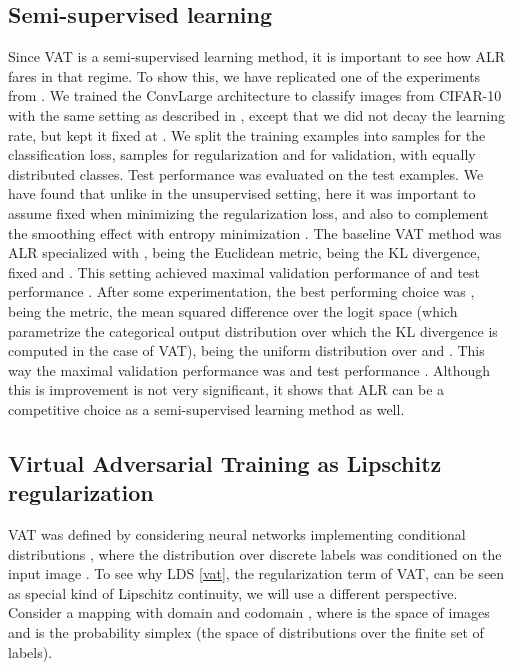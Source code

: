 \documentclass{article}
\begin{document}
\subsection{Semi-supervised learning} \label{semisup}
Since VAT is a semi-supervised learning method, it is important to see how ALR fares in that regime. To show this, we have replicated one of the experiments from \citet{Miyatoetal2017}. We trained the ConvLarge architecture to classify images from CIFAR-10 with the same setting as described in  \citet{Miyatoetal2017}, except that we did not decay the learning rate, but kept it fixed at . We split the  training examples into  samples for the classification loss,  samples for regularization and  for validation, with equally distributed classes. Test performance was evaluated on the  test examples. We have found that unlike in the unsupervised setting, here it was important to assume  fixed when minimizing the regularization loss, and also to complement the smoothing effect with entropy minimization \citep{Grandvaletetal2005}. The baseline VAT method was ALR specialized with ,  being the Euclidean metric,  being the KL divergence, fixed  and . This setting achieved maximal validation performance of  and test performance . After some experimentation, the best performing choice was ,  being the  metric,  the mean squared difference over the logit space (which parametrize the categorical output distribution over which the KL divergence is computed in the case of VAT),  being the uniform distribution over  and . This way the maximal validation performance was  and test performance . Although this  is improvement is not very significant, it shows that ALR can be a competitive choice as a semi-supervised learning method as well.

\subsection{Virtual Adversarial Training as Lipschitz regularization} \label{vat_as_lr}
VAT was defined by considering neural networks implementing conditional distributions , where the distribution over discrete labels  was conditioned on the input image  \cite{Miyatoetal2017}. To see why LDS \eqref{vat}, the regularization term of VAT, can be seen as special kind of Lipschitz continuity, we will use a different perspective. Consider a mapping  with domain  and codomain , where  is the space of images and  is the probability simplex (the space of distributions over the finite set of labels).
\end{document}
